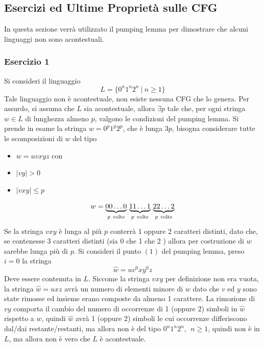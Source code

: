 \documentclass[10pt, letterpaper]{report}
\begin{document}
\subsection{Esercizi ed Ultime Proprietà sulle CFG}
In questa sezione verrà utilizzato il pumping lemma per dimostrare che alcuni linguaggi non sono acontestuali.
\subsubsection{Esercizio 1}
Si consideri il linguaggio 
$$ L=\{0^n1^n2^n \ | \ n \ge 1 \}$$
Tale linguaggio non è acontestuale, non esiste nessuna CFG che lo genera. Per assurdo, si assuma che 
$L$ sia acontestuale, allora $\exists p$ tale che, per ogni stringa $w\in L$ di lunghezza almeno
$p$, valgono le condizioni del pumping lemma. \acc 
Si prende in esame la stringa $w=0^p1^p2^p$, che è lunga $3p$, bisogna considerare tutte le scomposizioni di $w$ del tipo\begin{itemize}
    \item $w=uvxyz$ con  
    \item $|vy|>0$
    \item $|vxy|\le p$
\end{itemize}
$$ w=\smash{\underbrace{00\dots 0}_{p\ \text{volte}}} \
\smash{\underbrace{11\dots 1}_{p\ \text{volte}}} \
\smash{\underbrace{22\dots 2}_{p\ \text{volte}}}$$
\\Se la stringa $vxy$ è lunga al più $p$ conterrà 1 oppure 2 caratteri distinti, dato che, se contenesse 3 caratteri distinti (sia 0 che 1 che 2 ) allora 
per costruzione di $w$ sarebbe lunga più di $p$. Si consideri il punto $(1)$ del pumping lemma, preso $i=0$ la stringa 
$$ \hat w=uv^0xy^0z$$
Deve essere contenuta in $L$. Siccome la stringa $vxy$ per definizione non era vuota, la stringa $\hat w = uxz$ 
avrà un numero di elementi minore di $w$ dato che $v$ ed $y$ sono state rimosse ed insieme erano composte da 
almeno 1 carattere. 
\acc 
La rimozione di $vy$ comporta il cambio del numero di occorrenze di 1 (oppure 2) simboli in $\hat w$ rispetto a 
$w$, quindi $\hat w$ avrà 1 (oppure 2) simboli le cui occorrenze differiscono dal/dai restante/restanti, ma allora 
non è del tipo $0^n1^n2^n, \ \ n \ge 1$, quindi non è in $L$, ma allora non è vero che 
$L$ è acontestuale.
\end{document}
